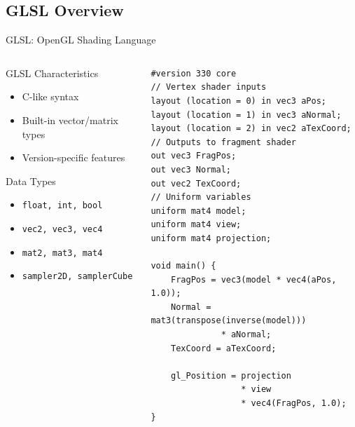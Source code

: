\subsection{GLSL Overview}
\begin{frame}[fragile]{GLSL: OpenGL Shading Language}
  \begin{columns}
    \begin{column}{0.5\textwidth}
      \small
      \begin{raybox}{GLSL Characteristics}
        \footnotesize
        \begin{itemize}
          \item C-like syntax
          \item Built-in vector/matrix types
          \item Version-specific features
        \end{itemize}
      \end{raybox}

      \begin{mathbox}{Data Types}
        \footnotesize
        \begin{itemize}
          \item \texttt{float, int, bool}
          \item \texttt{vec2, vec3, vec4}
          \item \texttt{mat2, mat3, mat4}
          \item \texttt{sampler2D, samplerCube}
        \end{itemize}
      \end{mathbox}
    \end{column}
    \begin{column}{0.5\textwidth}
      \begin{verbatim}
#version 330 core
// Vertex shader inputs
layout (location = 0) in vec3 aPos;
layout (location = 1) in vec3 aNormal;
layout (location = 2) in vec2 aTexCoord;
// Outputs to fragment shader
out vec3 FragPos;
out vec3 Normal;
out vec2 TexCoord;
// Uniform variables
uniform mat4 model;
uniform mat4 view;
uniform mat4 projection;

void main() {
    FragPos = vec3(model * vec4(aPos, 1.0));
    Normal = mat3(transpose(inverse(model)))
              * aNormal;
    TexCoord = aTexCoord;

    gl_Position = projection
                  * view
                  * vec4(FragPos, 1.0);
}
      \end{verbatim}
    \end{column}
  \end{columns}
\end{frame}

